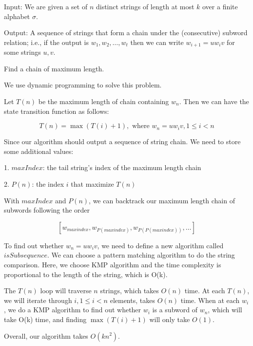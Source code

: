 \newpage
{} %

\problemdes

Input: We are given a set of $n$ distinct strings of length at most $k$ over a finite alphabet $\sigma$.

Output: A sequence of strings that form a chain under the (consecutive) subword relation; i.e., if the output is $w_{1}, w_{2}, \dots, w_{t}$ then we can write $w_{i+1}=u w_{i} v$ for some strings $u,v$.

Find a chain of maximum length.

\solution


We use dynamic programming to solve this problem. 

Let $T(n)$ be the maximum length of chain containing $w_n$. Then we can have the state transition function as follows:

$$T(n) = \max(T(i) + 1), \text{ where }w_{n}=u w_{i} v, 1\leq i <n$$

Since our algorithm should output a sequence of string chain. We need to store some additional values:

1. $maxIndex$: the tail string's index of the maximum length chain

2. $P(n)$: the index $i$ that maximize $T(n)$

With $maxIndex$ and $P(n)$, we can backtrack our maximum length chain of subwords following the order

$$[w_{maxindex}, w_{P(maxindex)}, w_{P(P(maxindex))}, \dots]$$

To find out whether $w_{n}=u w_{i} v$, we need to define a new algorithm called $isSubsequence$. We can choose a pattern matching algorithm to do the string comparison. Here, we choose KMP algorithm and the time complexity is proportional to the length of the string, which is O(k).






The $T(n)$ loop will traverse $n$ strings, which takes $O(n)$ time. At each $T(n)$, we will iterate through $i, 1
\leq i < n$ elements, takes $O(n)$ time. When at each $w_i$, we do a KMP algorithm to find out whether $w_i$ is a subword of $w_n$, which will take O(k) time, and finding $\max(T(i) + 1)$ will only take $O(1)$.

Overall, our algorithm takes $O(kn^2)$.



